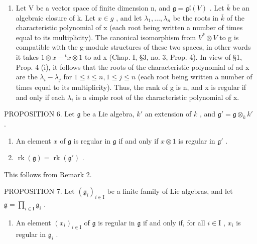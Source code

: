 \begin{enumerate}
\def\labelenumi{\arabic{enumi})}
\setcounter{enumi}{2}
\tightlist
\item
  Let V be a vector space of finite dimension n, and \(\mathfrak{g} = \mathfrak{gl}(V)\) . Let \(\overline{k}\) be an algebraic closure of k. Let \(x \in g\) , and let \(\lambda_{1}, \ldots, \lambda_{n}\) be the roots in \(\overline{k}\) of the characteristic polynomial of x (each root being written a number of times equal to its multiplicity). The canonical isomorphism from \(V^{*} \otimes V\) to g is compatible with the g-module structures of these two spaces, in other words it takes \(1 \otimes x - {}^{t}x \otimes 1\) to ad x (Chap. I, §3, no. 3, Prop. 4). In view of §1, Prop. 4 (i), it follows that the roots of the characteristic polynomial of ad x are the \(\lambda_{i} - \lambda_{j}\) for \(1 \leq i \leq n, 1 \leq j \leq n\) (each root being written a number of times equal to its multiplicity). Thus, the rank of g is n, and x is regular if and only if each \(\lambda_{i}\) is a simple root of the characteristic polynomial of x.
\end{enumerate}

PROPOSITION 6. Let \(\mathfrak{g}\) be a Lie algebra, \(k'\) an extension of \(k\) , and \(\mathfrak{g}' = \mathfrak{g} \otimes_k k'\) .

\begin{enumerate}
\def\labelenumi{(\roman{enumi})}
\tightlist
\item
  An element \(x\) of \(\mathfrak{g}\) is regular in \(\mathfrak{g}\) if and only if \(x \otimes 1\) is regular in \(\mathfrak{g}'\) .\\
\item
  \(\operatorname{rk}(\mathfrak{g}) = \operatorname{rk}(\mathfrak{g}')\) .
\end{enumerate}

This follows from Remark 2.

PROPOSITION 7. Let \((\mathfrak{g}_i)_{i\in \mathrm{I}}\) be a finite family of Lie algebras, and let \(\mathfrak{g} = \prod_{i\in \mathrm{I}}\mathfrak{g}_i\) .

\begin{enumerate}
\def\labelenumi{(\roman{enumi})}
\tightlist
\item
  An element \((x_{i})_{i\in \mathrm{I}}\) of \(\mathfrak{g}\) is regular in \(\mathfrak{g}\) if and only if, for all \(i\in \mathrm{I}\) , \(x_{i}\) is regular in \(\mathfrak{g}_i\) .
\end{enumerate}

